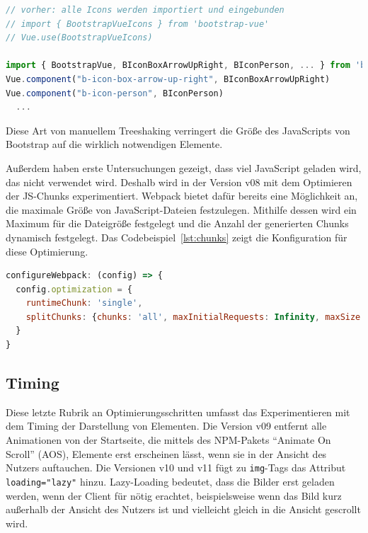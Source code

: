 \documentclass[11pt,a4paper]{article}
\begin{document}
\begin{lstlisting}[language=JavaScript, caption={Epliziter Import und Einbindung von Bootstrap-Icons}, label={lst:icons}]
// vorher: alle Icons werden importiert und eingebunden
// import { BootstrapVueIcons } from 'bootstrap-vue'
// Vue.use(BootstrapVueIcons)

import { BootstrapVue, BIconBoxArrowUpRight, BIconPerson, ... } from 'bootstrap-vue'
Vue.component("b-icon-box-arrow-up-right", BIconBoxArrowUpRight)
Vue.component("b-icon-person", BIconPerson)
  ...
\end{lstlisting}

Diese Art von manuellem Treeshaking verringert die Größe des JavaScripts von Bootstrap auf die wirklich notwendigen Elemente.

Außerdem haben erste Untersuchungen gezeigt, dass viel JavaScript geladen wird, das nicht verwendet wird.
Deshalb wird in der Version v08 mit dem Optimieren der JS-Chunks experimentiert.
Webpack bietet dafür bereits eine Möglichkeit an, die maximale Größe von JavaScript-Dateien festzulegen.
Mithilfe dessen wird ein Maximum für die Dateigröße festgelegt und die Anzahl der generierten Chunks dynamisch festgelegt.
Das Codebeispiel~\ref{lst:chunks} zeigt die Konfiguration für diese Optimierung.

\begin{lstlisting}[language=JavaScript, caption={Konfiguration von Webpack zur Limitierung der Chunkgröße}, label={lst:chunks}]
configureWebpack: (config) => {
  config.optimization = {
    runtimeChunk: 'single',
    splitChunks: {chunks: 'all', maxInitialRequests: Infinity, maxSize: 500000}
  }
}
\end{lstlisting}

\subsection{Timing}
Diese letzte Rubrik an Optimierungsschritten umfasst das Experimentieren mit dem Timing der Darstellung von Elementen.
Die Version v09 entfernt alle Animationen von der Startseite, die mittels des NPM-Pakets \enquote{Animate On Scroll} (AOS), Elemente erst erscheinen lässt, wenn sie in der Ansicht des Nutzers auftauchen.
Die Versionen v10 und v11 fügt zu \verb|img|-Tags das Attribut \verb|loading="lazy"| hinzu.
Lazy-Loading bedeutet, dass die Bilder erst geladen werden, wenn der Client für nötig erachtet, beispielsweise wenn das Bild kurz außerhalb der Ansicht des Nutzers ist und vielleicht gleich in die Ansicht gescrollt wird.
\end{document}
